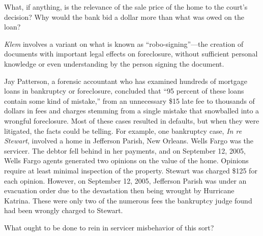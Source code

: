 \item What, if anything, is the relevance of the sale price of the home to the
court's decision? Why would the bank bid a dollar more than what was owed on
the loan?


\item \textit{Klem} involves a variant on what is known as
``robo-signing''---the creation of documents with important legal effects on
foreclosure, without sufficient personal knowledge or even understanding by the
person signing the document. 


Jay Patterson, a forensic accountant who has examined hundreds of mortgage loans
in bankruptcy or foreclosure, concluded that ``95 percent of these loans
contain some kind of mistake,'' from an unnecessary \$15 late fee to thousands
of dollars in fees and charges stemming from a single mistake that snowballed
into a wrongful foreclosure. Most of these cases resulted in defaults, but
when they were litigated, the facts could be telling. For example, one
bankruptcy case, \textit{In re Stewart}, involved a home in Jefferson Parish,
New Orleans. Wells Fargo was the servicer. The debtor fell behind in her
payments, and on September 12, 2005, Wells Fargo agents generated two opinions
on the value of the home. Opinions require at least minimal inspection of the
property. Stewart was charged \$125 for each opinion. However, on September
12, 2005, Jefferson Parish was under an evacuation order due to the devastation
then being wrought by Hurricane Katrina. These were only two of the numerous
fees the bankruptcy judge found had been wrongly charged to Stewart.


What ought to be done to rein in servicer misbehavior of this sort?

